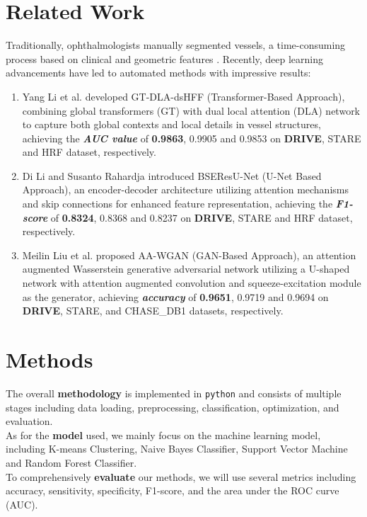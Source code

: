 \documentclass[12pt,letterpaper]{article}
\begin{document}
\section{Related Work}
Traditionally, ophthalmologists manually segmented vessels, a time-consuming process based on clinical and geometric features \cite{review2025}. Recently, deep learning advancements have led to automated methods with impressive results: 
\begin{enumerate}
    \item Yang Li et al. \cite{work1} developed GT-DLA-dsHFF (Transformer-Based Approach), combining global transformers (GT) with dual local attention (DLA) network to capture both global contexts and local details in vessel structures, achieving the \textbf{\textit{AUC value}} of \textbf{0.9863}, 0.9905 and 0.9853 on \textbf{DRIVE}, STARE and HRF dataset, respectively. 
    \item Di Li and Susanto Rahardja \cite{work2} introduced BSEResU-Net (U-Net Based Approach), an encoder-decoder architecture utilizing attention mechanisms and skip connections for enhanced feature representation, achieving the \textbf{\textit{F1-score}} of \textbf{0.8324}, 0.8368 and 0.8237 on \textbf{DRIVE}, STARE and HRF dataset, respectively. 
    \item Meilin Liu et al. \cite{work3} proposed AA-WGAN (GAN-Based Approach), an attention augmented Wasserstein generative adversarial network utilizing a U-shaped network with attention augmented convolution and squeeze-excitation module as the generator, achieving \textbf{\textit{accuracy}} of \textbf{0.9651}, 0.9719 and 0.9694 on \textbf{DRIVE}, STARE, and CHASE\_DB1 datasets, respectively.
\end{enumerate}


\section{Methods}
The overall \textbf{methodology} is implemented in \texttt{python} and consists of multiple stages including data loading, preprocessing, classification, optimization, and evaluation. \\
As for the \textbf{model} used, we mainly focus on the machine learning model, including K-means Clustering, Naive Bayes Classifier, Support Vector Machine and Random Forest Classifier. \\
To comprehensively \textbf{evaluate} our methods, we will use several metrics including accuracy, sensitivity, specificity, F1-score, and the area under the ROC curve (AUC).
\end{document}
